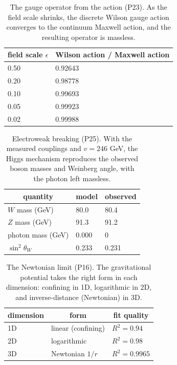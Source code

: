 \begin{table}[H]
\centering
\small
\begin{tabular}{ll}
\toprule
\multicolumn{1}{c}{field scale $\epsilon$} & \multicolumn{1}{c}{Wilson action / Maxwell action} \\
\midrule
0.50 & 0.92643 \\
0.20 & 0.98778 \\
0.10 & 0.99693 \\
0.05 & 0.99923 \\
0.02 & 0.99988 \\
\bottomrule
\end{tabular}
\caption{The gauge operator from the action (P23). As the field scale shrinks, the discrete Wilson gauge action converges to the continuum Maxwell action, and the resulting operator is massless.}
\end{table}

\begin{table}[H]
\centering
\small
\begin{tabular}{lll}
\toprule
\multicolumn{1}{c}{quantity} & \multicolumn{1}{c}{model} & \multicolumn{1}{c}{observed} \\
\midrule
$W$ mass (GeV) & 80.0 & 80.4 \\
$Z$ mass (GeV) & 91.3 & 91.2 \\
photon mass (GeV) & 0.000 & 0 \\
$\sin^2\theta_W$ & 0.233 & 0.231 \\
\bottomrule
\end{tabular}
\caption{Electroweak breaking (P25). With the measured couplings and $v = 246$ GeV, the Higgs mechanism reproduces the observed boson masses and Weinberg angle, with the photon left massless.}
\end{table}

\begin{table}[H]
\centering
\small
\begin{tabular}{lll}
\toprule
\multicolumn{1}{c}{dimension} & \multicolumn{1}{c}{form} & \multicolumn{1}{c}{fit quality} \\
\midrule
1D & linear (confining) & $R^2 = 0.94$ \\
2D & logarithmic & $R^2 = 0.98$ \\
3D & Newtonian $1/r$ & $R^2 = 0.9965$ \\
\bottomrule
\end{tabular}
\caption{The Newtonian limit (P16). The gravitational potential takes the right form in each dimension: confining in 1D, logarithmic in 2D, and inverse-distance (Newtonian) in 3D.}
\end{table}

